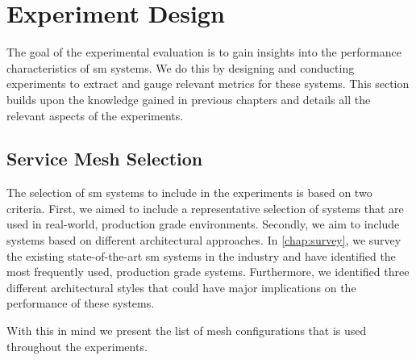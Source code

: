 \section{Experiment Design}
\label{sec:experiments:design}



The goal of the experimental evaluation is to gain insights into the performance characteristics of \gls{sm} systems. We do this by designing and conducting experiments to extract and gauge relevant metrics for these systems. This section builds upon the knowledge gained in previous chapters and details all the relevant aspects of the experiments.



\subsection{Service Mesh Selection}
\label{sec:experiments:design:meshes}

The selection of \gls{sm} systems to include in the experiments is based on two criteria. First, we aimed to include a representative selection of systems that are used in real-world, production grade environments. Secondly, we aim to include systems based on different architectural approaches. In \cref{chap:survey}, we survey the existing state-of-the-art \gls{sm} systems in the industry and have identified the most frequently used, production grade systems. Furthermore, we identified three different architectural styles that could have major implications on the performance of these systems.

With this in mind we present the list of mesh configurations that is used throughout the experiments.

